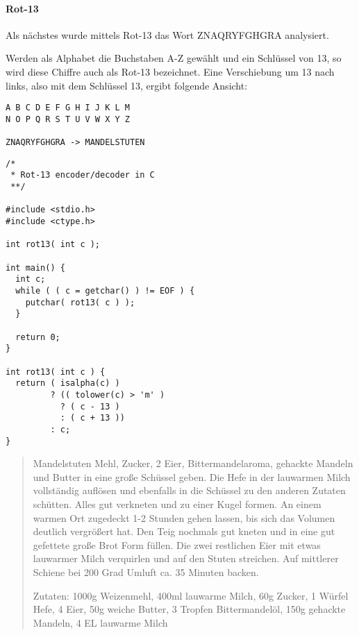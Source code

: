 \paragraph{Rot-13}

Als nächstes wurde mittels Rot-13 das Wort \glqq{}ZNAQRYFGHGRA\grqq{} analysiert.

Werden als Alphabet die Buchstaben A-Z gewählt und ein Schlüssel von 13, so wird
diese Chiffre auch als Rot-13 bezeichnet. Eine Verschiebung um 13 nach links,
also mit dem Schlüssel 13, ergibt folgende Ansicht:

\begin{lstlisting}
A B C D E F G H I J K L M
N O P Q R S T U V W X Y Z

ZNAQRYFGHGRA -> MANDELSTUTEN
\end{lstlisting}

\begin{lstlisting}[caption=Quellcode rot13.c]
/*
 * Rot-13 encoder/decoder in C
 **/

#include <stdio.h>
#include <ctype.h>

int rot13( int c );

int main() {
  int c;
  while ( ( c = getchar() ) != EOF ) {
    putchar( rot13( c ) );
  }

  return 0;
}

int rot13( int c ) {
  return ( isalpha(c) )
         ? (( tolower(c) > 'm' )
           ? ( c - 13 )
           : ( c + 13 ))
         : c;
}
\end{lstlisting}

\begin{quote}
Mandelstuten
Mehl, Zucker, 2 Eier, Bittermandelaroma, gehackte Mandeln und Butter in eine große Schüssel geben.
Die Hefe in der lauwarmen Milch vollständig auflösen und ebenfalls in die Schüssel zu den anderen Zutaten schütten. Alles gut verkneten und zu einer Kugel formen.
An einem warmen Ort zugedeckt 1-2 Stunden gehen lassen, bis sich das Volumen deutlich vergrößert hat.
Den Teig nochmals gut kneten und in eine gut gefettete große Brot Form füllen.
Die zwei restlichen Eier mit etwas lauwarmer Milch verquirlen und auf den Stuten streichen.
Auf mittlerer Schiene bei 200 Grad Umluft ca. 35 Minuten backen.

Zutaten: 1000g Weizenmehl, 400ml lauwarme Milch, 60g Zucker, 1 Würfel Hefe, 4 Eier, 50g weiche Butter, 3 Tropfen Bittermandelöl,
150g gehackte Mandeln, 4 EL lauwarme Milch
\end{quote}

